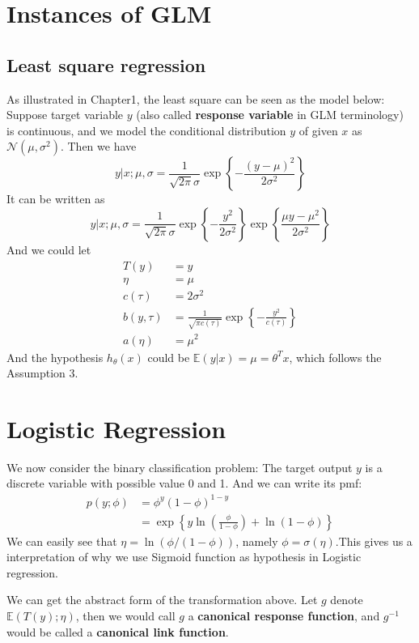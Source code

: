 \section{Instances of GLM}

\subsection{Least square regression}

As illustrated in Chapter1, the least square can be seen as the model below:
Suppose target variable $y$ (also called \textbf{response variable} in GLM terminology) is continuous, and we model the conditional distribution $y$ of given $x$ as $\mathcal{N}(\mu,\sigma^2)$.
Then we have 
\[y|x;\mu,\sigma = \frac{1}{\sqrt{2\pi}\sigma}\exp\left\{-\frac{(y-\mu)^2}{2\sigma^2}\right\}\]
It can be written as 
\[y|x;\mu,\sigma = \frac{1}{\sqrt{2\pi}\sigma}\exp\left\{-\frac{y^2}{2\sigma^2}\right\}\exp\left\{\frac{\mu y-\mu^2}{2\sigma^2}\right\}\]
And we could let
$$
\begin{aligned}
    T(y) &= y\\
    \eta &= \mu\\
    c(\tau) &= 2\sigma^2\\
    b(y,\tau) &= \frac{1}{\sqrt{\pi c(\tau)}}\exp\left\{-\frac{y^2}{c(\tau)}\right\}\\
    a(\eta) &= \mu^2
\end{aligned}
$$
And the hypothesis $h_\theta(x)$ could be $\mathbb{E}(y|x) = \mu = \theta^Tx$, which follows the Assumption 3.

\section{Logistic Regression}

We now consider the binary classification problem: The target output $y$ is a discrete variable with possible value 0 and 1. And we can write its pmf:
$$
    \begin{aligned}
        p(y;\phi)&=\phi^y(1-\phi)^{1-y}\\
                &= \exp\left\{y\ln\left(\frac{\phi}{1-\phi}\right)+\ln(1-\phi)\right\}
    \end{aligned}
$$
We can easily see that $\eta = \ln\left(\phi/(1-\phi)\right)$, namely $\phi = \sigma(\eta)$.This gives us a interpretation of why we use Sigmoid function as hypothesis in Logistic regression.

We can get the abstract form of the transformation above. Let $g$ denote $\mathbb{E}(T(y);\eta)$, then we would call $g$ a \textbf{canonical response function}, and $g^{-1}$ would be called a 
\textbf{canonical link function}.

